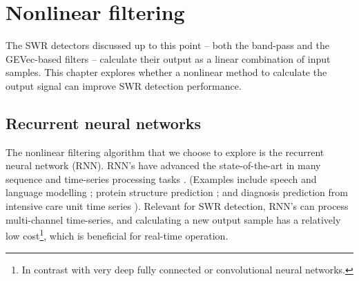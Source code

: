 \chapter{Nonlinear filtering}
\label{ch:RNN}

The SWR detectors discussed up to this point -- both the band-pass and the GEVec-based filters -- calculate their output as a linear combination of input samples. This chapter explores whether a nonlinear method to calculate the output signal can improve SWR detection performance.


\section{Recurrent neural networks}

The nonlinear filtering algorithm that we choose to explore is the recurrent neural network (RNN). RNN's have advanced the state-of-the-art in many sequence and time-series processing tasks \cite{Greff2017}. (Examples include speech and language modelling \cite{LeCun2015,Goodfellow2016}; protein structure prediction \cite{Sonderby2014}; and diagnosis prediction from intensive care unit time series \cite{Lipton2015}).\footnotemark{} Relevant for SWR detection, RNN's can process multi-channel time-series, and calculating a new output sample has a relatively low cost\footnote{In contrast with very deep fully connected or convolutional neural networks.}, which is beneficial for real-time operation.



